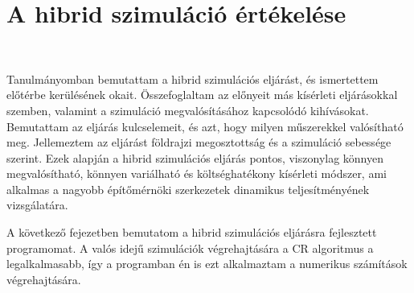 \section{A hibrid szimuláció értékelése}

{\ }

Tanulmányomban bemutattam a hibrid szimulációs eljárást, és ismertettem előtérbe kerülésének okait. Összefoglaltam az előnyeit más kísérleti eljárásokkal szemben, valamint a szimuláció megvalósításához kapcsolódó kihívásokat. Bemutattam az eljárás kulcselemeit, és azt, hogy milyen műszerekkel valósítható meg. Jellemeztem az eljárást földrajzi megosztottság  és a szimuláció sebessége szerint. Ezek  alapján a hibrid szimulációs eljárás pontos, viszonylag könnyen megvalósítható, könnyen variálható  és költséghatékony kísérleti módszer, ami alkalmas a nagyobb építőmérnöki szerkezetek dinamikus teljesítményének vizsgálatára. 

 A következő fejezetben bemutatom a hibrid szimulációs eljárásra fejlesztett programomat. A valós idejű  szimulációk végrehajtására a CR algoritmus a legalkalmasabb, így  a programban én is ezt  alkalmaztam a numerikus számítások végrehajtására.











